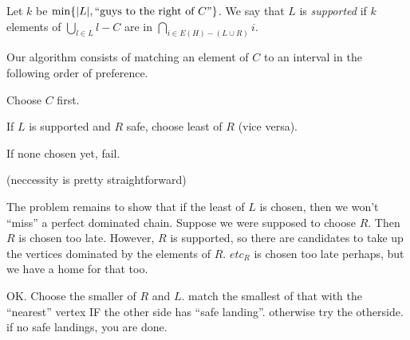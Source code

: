 Let $k$ be $\min \{|L|, \makebox{``guys to the right of $C$''}\}$.  We say that $L$ is {\it supported} if $k$ elements of $\displaystyle\bigcup_{l\in L}l - C$ are in $\displaystyle\bigcap_{i\in E(H) - (L\cup R)}i$.  

Our algorithm consists of matching an element of $C$ to an interval in the following order of preference.

Choose $C$ first.

If $L$ is supported and $R$ safe, choose least of $R$ (vice versa).

If none chosen yet, fail.

(neccessity is pretty straightforward)

The problem remains to show that if the least of $L$ is chosen, then we won't ``miss'' a perfect dominated chain.  Suppose we were supposed to choose $R$.  Then $R$ is chosen too late.  However, $R$ is supported, so there are candidates to take up the vertices dominated by the elements of $R$.  $etc_R$ is chosen too late perhaps, but we have a home for that too.  

OK.  Choose the smaller of $R$ and $L$.  match the smallest of that with the ``nearest'' vertex IF the other side has ``safe landing''.  otherwise try the otherside.  if no safe landings, you are done.

